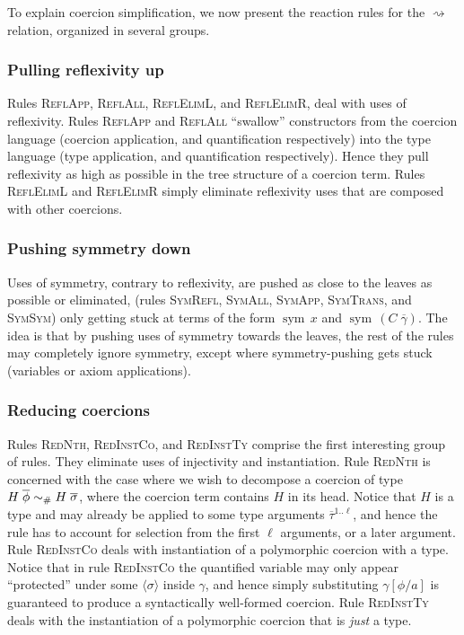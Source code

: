 \documentclass[a4paper,UKenglish]{lipics}
\def\rulename#1{\textsc{#1}}
\newcommand{\psim}{\mathrel{\sim_{\tiny \#}}}
\def\rulename#1{\textsc{#1}}
\newcommand{\ol}[1]{\overline{#1}}
\newcommand{\sym}[1]{\mathop{sym}\, #1}
\newcommand{\refl}[1]{\langle#1\rangle}  %
\newcommand{\rsa}[1]{\rightsquigarrow_{#1}}
\newcommand{\gammas}{\ol{\gamma}}
\newcommand{\phis}{\ol{\phi}}
\newcommand{\sigmas}{\ol{\sigma}}
\newcommand{\taus}{\ol{\tau}}
\begin{document}
To explain coercion simplification, we now present the reaction rules 
for the $\rsa{}$ relation, organized in several groups.

\subsubsection{Pulling reflexivity up} 
Rules \rulename{ReflApp}, \rulename{ReflAll}, \rulename{ReflElimL}, and \rulename{ReflElimR}, deal with 
uses of reflexivity. Rules \rulename{ReflApp} and \rulename{ReflAll} ``swallow'' constructors from the 
coercion language (coercion application, and quantification respectively) into the type language 
(type application, and quantification respectively). Hence they pull reflexivity as high as 
possible in the tree structure of a coercion term. Rules \rulename{ReflElimL} and \rulename{ReflElimR} 
simply eliminate reflexivity uses that are composed with other coercions. 

\subsubsection{Pushing symmetry down} 
Uses of symmetry, contrary to reflexivity, are pushed as close to the leaves as possible or eliminated, 
(rules \rulename{SymRefl}, \rulename{SymAll}, \rulename{SymApp}, \rulename{SymTrans}, and \rulename{SymSym})
only getting stuck at terms of the form 
$\sym{x}$ and $\sym{(C\;\gammas)}$.
The idea is that by pushing uses of symmetry towards the leaves, 
the rest of the rules may completely ignore symmetry, except where 
symmetry-pushing gets stuck (variables or axiom applications). 

\subsubsection{Reducing coercions}
Rules \rulename{RedNth}, \rulename{RedInstCo}, and \rulename{RedInstTy} comprise the first interesting group of rules.
They eliminate uses of injectivity and instantiation. Rule \rulename{RedNth} is concerned with the case where 
we wish to decompose a coercion of type $H\;\phis \psim H\;\sigmas$, where the coercion term contains $H$ in its head.
Notice that $H$ is a type and may already be applied to some type arguments $\taus^{1..\ell}$, and hence the rule 
has to account for selection from the first $\ell$ arguments, or a later argument. Rule \rulename{RedInstCo} deals
with instantiation of a polymorphic coercion with a type. Notice that in rule \rulename{RedInstCo} the quantified variable
may only appear ``protected'' under some $\refl{\sigma}$ inside $\gamma$, and hence simply substituting $\gamma[\phi/a]$ is 
guaranteed to produce a syntactically well-formed coercion. Rule \rulename{RedInstTy} deals with the instantiation of a 
polymorphic coercion that is {\em just} a type.
\end{document}
